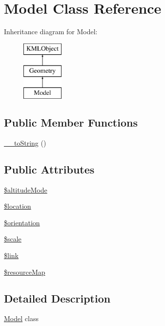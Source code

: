 \hypertarget{classModel}{
\section{Model Class Reference}
\label{d6/d18/classModel}
}
Inheritance diagram for Model:\begin{figure}[H]
\begin{center}
\leavevmode
\includegraphics[height=3.000000cm]{d6/d18/classModel}
\end{center}
\end{figure}
\subsection*{Public Member Functions}
\begin{DoxyCompactItemize}
\item 
\hyperlink{classModel_a382fdbffcf380bd37ccde3d26df12c06}{\_\-\_\-toString} ()
\end{DoxyCompactItemize}
\subsection*{Public Attributes}
\begin{DoxyCompactItemize}
\item 
\hyperlink{classModel_a06d61df06c3eaf3b93ee4b0cf68e8902}{\$altitudeMode}
\item 
\hyperlink{classModel_a70f4c7ba95e13df59daad4bd7158fe1c}{\$location}
\item 
\hyperlink{classModel_ae52867ece7af6ed10f06b191c15ab0ae}{\$orientation}
\item 
\hyperlink{classModel_af7ebafa9414f9d65bbf565cdc47e6d28}{\$scale}
\item 
\hyperlink{classModel_ad2f6d36aa12d03dbb95dc69b15ba97a7}{\$link}
\item 
\hyperlink{classModel_af21f76ac7d10efcb052b1e11be6ce910}{\$resourceMap}
\end{DoxyCompactItemize}


\subsection{Detailed Description}
\hyperlink{classModel}{Model} class 

